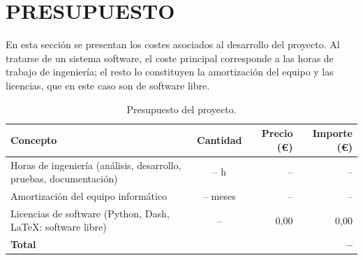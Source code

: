 \chapter*{PRESUPUESTO}
\renewcommand{\thetable}{P.\arabic{table}}
\setcounter{table}{0}
\label{ch:presupuesto}



En esta sección se presentan los costes asociados al desarrollo del proyecto. Al tratarse de un sistema software, el coste principal corresponde a las horas de trabajo de ingeniería; el resto lo constituyen la amortización del equipo y las licencias, que en este caso son de software libre.


\begin{table}[ht]
\centering
\begin{tabular}{ |m{6.5cm}|c|r|r| }
 \hline
 \rowcolor{LightCyan}
 Concepto & Cantidad & Precio (\euro) & Importe (\euro)\\
 \hline
 Horas de ingeniería (análisis, desarrollo, pruebas, documentación) & -- h & -- & -- \\
 \hline
 Amortización del equipo informático & -- meses & -- & -- \\
 \hline
 Licencias de software (Python, Dash, \LaTeX{}: software libre) & -- & 0,00 & 0,00 \\
 \hline
 \textbf{Total} &  &  & \textbf{--} \\
 \hline
\end{tabular}
\caption{Presupuesto del proyecto.}
\label{tabla:presupuesto}
\end{table}
